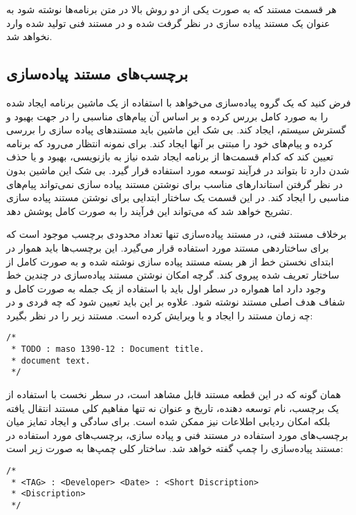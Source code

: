 هر قسمت مستند که به صورت یکی از دو روش بالا در متن برنامه‌ها نوشته شود به عنوان یک مستند پیاده سازی
در نظر گرفت شده و در مستند فنی تولید شده وارد نخواهد شد.

\subsection{برچسب‌های مستند پیاده‌سازی}
فرض کنید که یک گروه پیاده‌سازی می‌خواهد با استفاده از یک ماشین برنامه ایجاد شده را به صورد کامل
بررس کرده و بر اساس آن پیام‌های مناسبی را در جهت بهبود و گسترش سیستم، ایجاد کند. بی شک این ماشین
باید مستندهای پیاده سازی را بررسی کرده و پیام‌های خود را مبتنی بر آنها ایجاد کند. برای نمونه انتظار
می‌رود که برنامه تعیین کند که کدام قسمت‌ها از برنامه ایجاد شده نیاز به بازنویسی، بهبود و یا حذف شدن 
دارد تا بتواند در فرآیند توسعه مورد استفاده قرار گیرد. بی شک این ماشین بدون در نظر گرفتن استاندارهای
مناسب برای نوشتن مستند پیاده سازی نمی‌تواند پیام‌های مناسبی را ایجاد کند. در این قسمت یک ساختار ابتدایی
برای نوشتن مستند پیاده سازی تشریح خواهد شد که می‌تواند این فرآیند را به صورت کامل پوشش دهد.

برخلاف مستند فنی، در مستند پیاده‌سازی تنها تعداد محدودی برچسب موجود است که برای ساختاردهی مستند مورد
استفاده قرار می‌گیرد. این برچسب‌ها باید هموار در ابتدای نخستن خط از هر بسته مستند پیاده سازی نوشته
شده و به صورت کامل از ساختار تعریف شده پیروی کند. گرچه امکان نوشتن مستند پیاده‌سازی در چندین خط وجود
دارد اما همواره در سطر اول باید با استفاده از یک جمله به صورت کامل و شفاف هدف اصلی مستند نوشته شود.
علاوه بر این باید تعیین شود که چه فردی و در چه زمان مستند را ایجاد و یا ویرایش کرده است. مستند زیر
را در نظر بگیرد:


\begin{latin}
\lstset{language=C++}
\begin{lstlisting}[frame=single] 
/*
 * TODO : maso 1390-12 : Document title.
 * document text.
 */
\end{lstlisting}
\end{latin}

همان گونه که در این قطعه مستند قابل مشاهد است، در سطر نخست با استفاده از یک برچسب، نام توسعه دهنده، 
تاریخ و عنوان نه تنها مفاهیم کلی مستند انتقال یافته بلکه امکان ردیابی اطلاعات نیز ممکن شده است. 
برای سادگی و ایجاد تمایز میان برچسب‌های مورد استفاده در مستند فنی و پیاده سازی، برچسب‌های مورد استفاده
در مستند پیاده‌سازی را چمپ 
 گفته خواهد شد. ساختار کلی چمپ‌ها به صورت زیر است:


\begin{latin}
\lstset{language=C++}
\begin{lstlisting}[frame=single] 
/*
 * <TAG> : <Developer> <Date> : <Short Discription>
 * <Discription>
 */
\end{lstlisting}
\end{latin}

